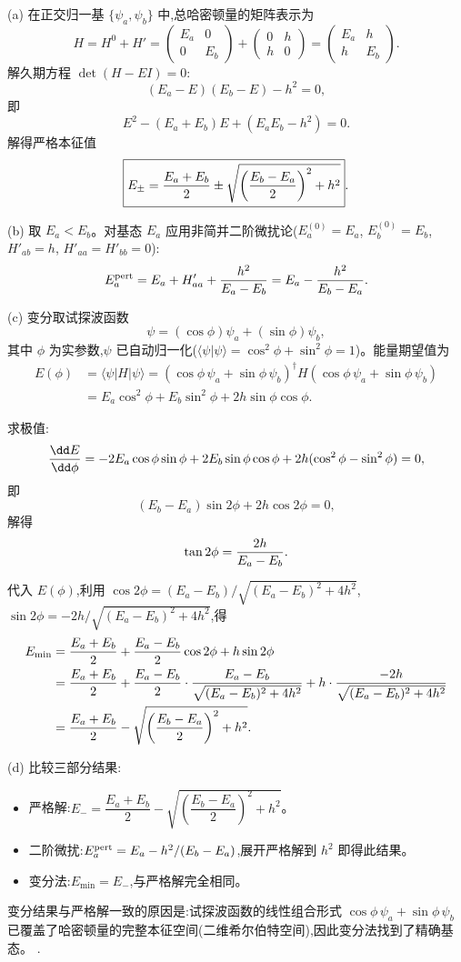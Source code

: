 \begin{solution}
(a) 在正交归一基 $\{\psi_a,\psi_b\}$ 中,总哈密顿量的矩阵表示为
\[
H=H^0+H'=\begin{pmatrix}E_a&0\\0&E_b\end{pmatrix}
+\begin{pmatrix}0&h\\h&0\end{pmatrix}
=\begin{pmatrix}E_a&h\\h&E_b\end{pmatrix}.
\]
解久期方程 $\det(H-EI)=0$:
\[
(E_a-E)(E_b-E)-h^2=0,
\]
即
\[
E^2-(E_a+E_b)E+(E_aE_b-h^2)=0.
\]
解得严格本征值
\[
\boxed{E_\pm={E_a+E_b\over2}\pm\sqrt{\left({E_b-E_a\over2}\right)^2+h^2}}.
\]

(b) 取 $E_a<E_b$。对基态 $E_a$ 应用非简并二阶微扰论($E_a^{(0)}=E_a$, $E_b^{(0)}=E_b$, $H'_{ab}=h$, $H'_{aa}=H'_{bb}=0$):
\[
E_a^{\rm pert}=E_a+{H'_{aa}}+{h^2\over E_a-E_b}
=E_a-{h^2\over E_b-E_a}.
\]

(c) 变分取试探波函数
\[
\psi=(\cos\phi)\psi_a+(\sin\phi)\psi_b,
\]
其中 $\phi$ 为实参数,$\psi$ 已自动归一化($\langle\psi|\psi\rangle=\cos^2\phi+\sin^2\phi=1$)。能量期望值为
\[
\begin{aligned}
E(\phi)&=\langle\psi|H|\psi\rangle
=(\cos\phi\,\psi_a+\sin\phi\,\psi_b)^\dagger H(\cos\phi\,\psi_a+\sin\phi\,\psi_b)\\
&=E_a\cos^2\phi+E_b\sin^2\phi+2h\sin\phi\cos\phi.
\end{aligned}
\]

求极值:
\[
{\dd E\over\dd\phi}=-2E_a\cos\phi\sin\phi+2E_b\sin\phi\cos\phi+2h(\cos^2\phi-\sin^2\phi)=0,
\]
即
\[
(E_b-E_a)\sin2\phi+2h\cos2\phi=0,
\]
解得
\[
\tan2\phi={2h\over E_a-E_b}.
\]

代入 $E(\phi)$,利用 $\cos2\phi=(E_a-E_b)/\sqrt{(E_a-E_b)^2+4h^2}$,$\sin2\phi=-2h/\sqrt{(E_a-E_b)^2+4h^2}$,得
\[
\begin{aligned}
E_{\min}&={E_a+E_b\over2}+{E_a-E_b\over2}\cos2\phi+h\sin2\phi\\
&={E_a+E_b\over2}+{E_a-E_b\over2}\cdot{E_a-E_b\over\sqrt{(E_a-E_b)^2+4h^2}}
+h\cdot{-2h\over\sqrt{(E_a-E_b)^2+4h^2}}\\
&={E_a+E_b\over2}-\sqrt{\left({E_b-E_a\over2}\right)^2+h^2}.
\end{aligned}
\]

(d) 比较三部分结果:
\begin{itemize}
\item 严格解:$E_-=\dfrac{E_a+E_b}{2}-\sqrt{\left(\dfrac{E_b-E_a}{2}\right)^2+h^2}$。
\item 二阶微扰:$E_a^{\rm pert}=E_a-h^2/(E_b-E_a)$,展开严格解到 $h^2$ 即得此结果。
\item 变分法:$E_{\min}=E_-$,与严格解完全相同。
\end{itemize}
变分结果与严格解一致的原因是:试探波函数的线性组合形式 $\cos\phi\,\psi_a+\sin\phi\,\psi_b$ 已覆盖了哈密顿量的完整本征空间(二维希尔伯特空间),因此变分法找到了精确基态。
.
\end{solution}

